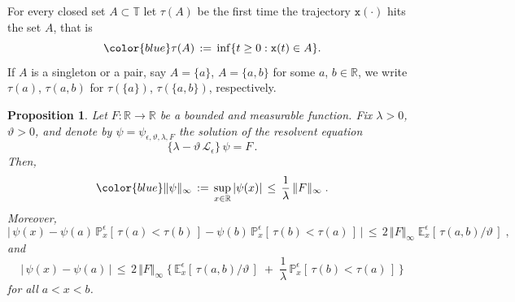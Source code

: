 \documentclass[reqno]{amsart}
\theoremstyle{plain}
\newtheorem{proposition}[theorem]{Proposition}
\theoremstyle{definition}
\newcommand{\bb}[1]{{\mathbb #1}}
\newcommand{\ms}[1]{{\mathscr #1}}
\newcommand{\mtt}[1]{{\mathtt #1}}
\newcounter{as}[section]
\newcommand{\<}{\langle}
\renewcommand{\>}{\rangle}
\begin{document}
For every closed set $A\subset \bb T$ let
$\tau(A)$ be the first time the trajectory $\mtt x(\cdot)$ hits the
set $A$, that is
\begin{equation}
\label{hit1}
{\color{blue} \tau(A)} \,:=\,
\inf\{t\geq 0: \mtt x (t) \in A\}.
\end{equation}
If $A$ is a singleton or a pair, say $A = \{a\}$, $A = \{a, b\}$ for
some $a$, $b\in \bb R$, we write $\tau(a)$, $\tau(a,b)$ for
$\tau(\{a\})$, $\tau(\{a, b\})$, respectively. 

\begin{proposition}
\label{l04}
Let $F\colon \bb R \to \bb R$ be a bounded and measurable
function. Fix $\lambda>0$, $\vartheta > 0$, and denote by
$\psi = \psi_{\epsilon, \vartheta, \lambda, F}$ the solution of the
resolvent equation
\begin{equation*}
\{\lambda - \vartheta \, \ms L_{\epsilon}\}\, \psi = F\,.
\end{equation*}
Then,
\begin{equation}
\label{54}
{\color{blue} \Vert\psi \Vert_\infty} \,:=\,
\sup_{x\in \bb R} |\psi(x)| \,\le\, \frac{1}{\lambda}\,
\Vert F\Vert_\infty \;.
\end{equation}
Moreover,
\begin{equation*}
\Big|\, \psi(x) - \psi(a)\,
\bb P^{\epsilon}_{x}[\, \tau(a)< \tau(b)\,]
- \psi(b)\, \bb P^{\epsilon}_{x}
[\, \tau(b)< \tau(a)\,] \, \Big| \, \le \,
2\, \Vert F \Vert_\infty \;
\bb E^{\epsilon}_{x} [\, \tau(a,b) /\vartheta \, ]\;,
\end{equation*}
and
\begin{equation}
\label{08}
\big|\, \psi(x) - \psi(a)\, \big| \, \le \,
2\, \Vert F \Vert_\infty \; \Big\{\, \bb E^{\epsilon}_{x} [\,
\tau(a,b) /\vartheta \, ]
\;+\; \frac{1}{\lambda} \, 
\bb P^{\epsilon}_{x} [\, \tau(b)< \tau(a)\, ]\,\Big\}  
\end{equation}
for all $a < x < b$. 
\end{proposition}
\end{document}
